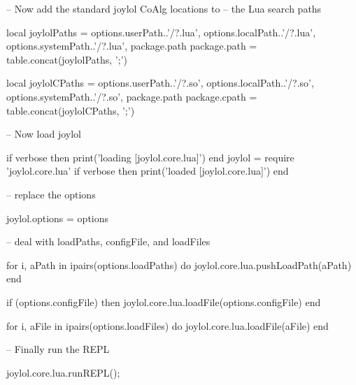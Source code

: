 -- Now add the standard joylol CoAlg locations to
-- the Lua search paths 

local joylolPaths = {
  options.userPath..'/?.lua',
  options.localPath..'/?.lua',
  options.systemPath..'/?.lua',
  package.path
}
package.path = table.concat(joylolPaths, ';')

local joylolCPaths = {
  options.userPath..'/?.so',
  options.localPath..'/?.so',
  options.systemPath..'/?.so',
  package.path
}
package.cpath = table.concat(joylolCPaths, ';')

-- Now load joylol

if verbose then print('loading [joylol.core.lua]') end
joylol = require 'joylol.core.lua'
if verbose then print('loaded [joylol.core.lua]\n') end

-- replace the options

joylol.options = options

--  deal with loadPaths, configFile, and loadFiles

for i, aPath in ipairs(options.loadPaths) do
  joylol.core.lua.pushLoadPath(aPath)
end

if (options.configFile) then
  joylol.core.lua.loadFile(options.configFile)
end

for i, aFile in ipairs(options.loadFiles) do
  joylol.core.lua.loadFile(aFile)
end

-- Finally run the REPL

joylol.core.lua.runREPL();

\stopLuaCode